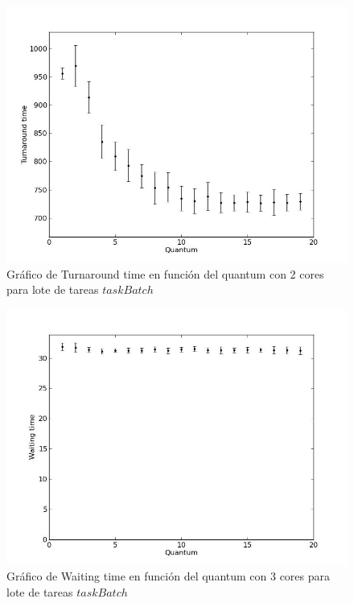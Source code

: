 \begin{figure}[H]
	\begin{center}
		  \includegraphics[scale=0.3]{graficos/cores_2_ta.jpg}
		  \caption{Gráfico de Turnaround time en función del quantum con 2 cores para lote de tareas $taskBatch$}
		  \label{fig:contra1}
	\end{center}
\end{figure}

\begin{figure}[H]
	\begin{center}
		  \includegraphics[scale=0.3]{graficos/cores_3_wt.jpg}
		  \caption{Gráfico de Waiting time en función del quantum con 3 cores para lote de tareas $taskBatch$}
		  \label{fig:contra1}
	\end{center}
\end{figure}

